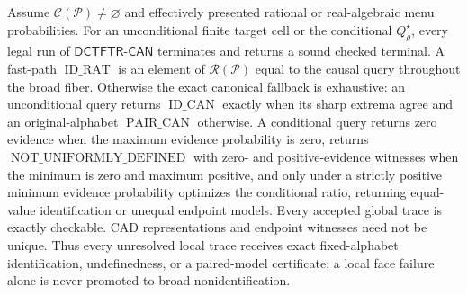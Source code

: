 Assume \(\mathcal C(\mathcal P)\ne\varnothing\) and effectively presented rational or real-algebraic menu probabilities.  For an unconditional finite target cell or the conditional \(Q_\rho^\star\), every legal run of \(\mathsf{DCTFTR\text{-}CAN}\) terminates and returns a sound checked terminal.  A fast-path \(\operatorname{ID\_RAT}\) is an element of \(\mathscr R(\mathcal P)\) equal to the causal query throughout the broad fiber.  Otherwise the exact canonical fallback is exhaustive: an unconditional query returns \(\operatorname{ID\_CAN}\) exactly when its sharp extrema agree and an original-alphabet \(\operatorname{PAIR\_CAN}\) otherwise.  A conditional query returns zero evidence when the maximum evidence probability is zero, returns \(\operatorname{NOT\_UNIFORMLY\_DEFINED}\) with zero- and positive-evidence witnesses when the minimum is zero and maximum positive, and only under a strictly positive minimum evidence probability optimizes the conditional ratio, returning equal-value identification or unequal endpoint models.  Every accepted global trace is exactly checkable.  CAD representations and endpoint witnesses need not be unique.  Thus every unresolved local trace receives exact fixed-alphabet identification, undefinedness, or a paired-model certificate; a local face failure alone is never promoted to broad nonidentification.